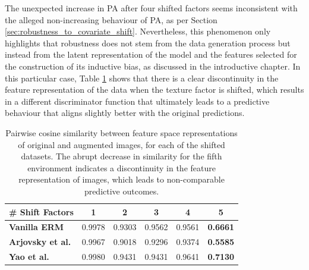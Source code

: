 The unexpected increase in PA after four shifted factors seems
inconsistent with the alleged non-increasing behaviour of PA, as per
Section \ref{sec:robustness_to_covariate_shift}. Nevertheless, this phenomenon 
only highlights that robustness does not stem from the data generation process but instead 
from the latent representation of the model and the features selected for the construction 
of its inductive bias, as discussed in the introductive chapter. In this particular case, 
Table \ref{tab:CS_shift} shows that
there is a clear discontinuity in the feature representation of the data when the texture
factor is shifted, which results in a different discriminator function that ultimately
leads to a predictive behaviour that aligns slightly better with the original predictions. \\

\begin{table}[H]
    \centering
    \begin{tabular}{l|c|c|c|c|c}
    \# Shift Factors & 1 & 2 & 3 & 4 & 5 \\
    \midrule
    {\color{tab:blue} \textbf{Vanilla ERM}} & 0.9978 & 0.9303 & 0.9562 & 0.9561 & \textbf{0.6661} \\
    {\color{tab:orange} \textbf{Arjovsky et al.}} & 0.9967 & 0.9018 & 0.9296 & 0.9374 & \textbf{0.5585} \\
    {\color{tab:green} \textbf{Yao et al.}}  & 0.9980 & 0.9431 & 0.9431 & 0.9641 & \textbf{0.7130} \\
    \bottomrule
    \end{tabular}
    \caption{
    Pairwise cosine similarity between feature space representations of original and
    augmented images, for each of the shifted datasets. The abrupt decrease in similarity
    for the fifth environment indicates a discontinuity in the feature representation of images,
    which leads to non-comparable predictive outcomes.
    }
    \label{tab:CS_shift}
    \end{table}




